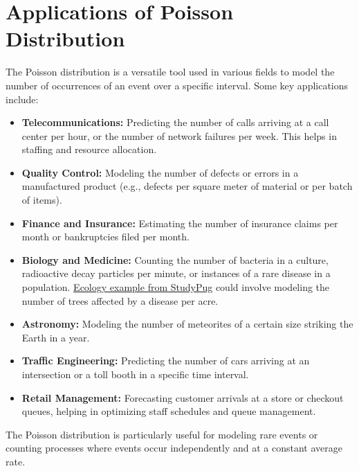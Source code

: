 \section{Applications of Poisson Distribution}
The Poisson distribution is a versatile tool used in various fields to model the number of occurrences of an event over a specific interval. Some key applications include:
\begin{itemize}
  \item \textbf{Telecommunications:} Predicting the number of calls arriving at a call center per hour, or the number of network failures per week. This helps in staffing and resource allocation.
  \item \textbf{Quality Control:} Modeling the number of defects or errors in a manufactured product (e.g., defects per square meter of material or per batch of items).
  \item \textbf{Finance and Insurance:} Estimating the number of insurance claims per month or bankruptcies filed per month.
  \item \textbf{Biology and Medicine:} Counting the number of bacteria in a culture, radioactive decay particles per minute, or instances of a rare disease in a population. \href{https://www.studypug.com/statistics-help/poisson-distribution}{Ecology example from StudyPug} could involve modeling the number of trees affected by a disease per acre.
  \item \textbf{Astronomy:} Modeling the number of meteorites of a certain size striking the Earth in a year.
  \item \textbf{Traffic Engineering:} Predicting the number of cars arriving at an intersection or a toll booth in a specific time interval.
  \item \textbf{Retail Management:} Forecasting customer arrivals at a store or checkout queues, helping in optimizing staff schedules and queue management.
\end{itemize}
The Poisson distribution is particularly useful for modeling rare events or counting processes where events occur independently and at a constant average rate.
